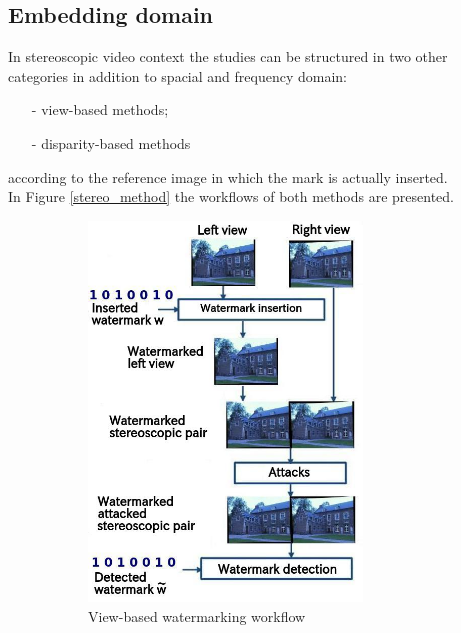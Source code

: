 \subsection{Embedding domain}
In stereoscopic video context the studies can be structured in two other categories in addition to spacial and frequency domain:
\begin{itemize}
\item[-] view-based methods;
\item[-] disparity-based methods
\end{itemize}
according to the reference image in which the mark is actually inserted.\\
In Figure \ref{stereo_method} the workflows of both methods are presented.
\begin{figure}[h!]
\centering
\begin{subfigure}[]{0.4\textwidth}
\centering
\includegraphics[width=0.8\textwidth]{./img/views_domain.jpeg}
\caption{\small{View-based watermarking workflow}}
\label{fig:view}
\end{subfigure}%
~ %
\begin{subfigure}[]{0.4\textwidth}

\end{subfigure}
\end{figure}
